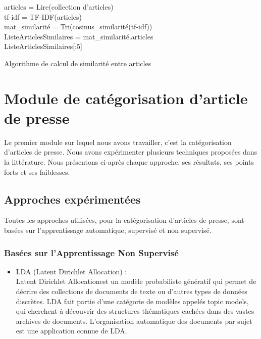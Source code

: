     \begin{algorithm2e}[H]
        \SetAlgoLined
        articles = Lire(collection d'articles)\\
        tf-idf = TF-IDF(articles)\\
        mat\_similarité = Tri(cosinus\_similarité(tf-idf))\\
        ListeArticlesSimilaires = mat\_similarité.articles\\
        \Return ListeArticlesSimilaires[:5]
        \caption{Algorithme de calcul de similarité entre articles}
    \end{algorithm2e}

\section{Module de catégorisation d'article de presse}
Le premier module sur lequel nous avons travailler, c'est la catégorisation d'articles de presse. Nous avons expérimenter plusieurs techniques proposées dans la littérature. Nous présentons ci-après chaque approche, ses résultats, ses points forts et ses faiblesses.

    \subsection{Approches expérimentées\label{approches}}
    Toutes les approches utilisées, pour la catégorisation d'articles de presse, sont basées sur l'apprentissage automatique, supervisé et non supervisé. 

    \subsubsection{Basées sur l'Apprentissage Non Supervisé}
        \begin{itemize}
            \item{LDA (Latent Dirichlet Allocation) : }\\
            \textquotedbl Latent Dirichlet Allocation\textquotedbl  est un modèle probabiliste génératif qui permet de décrire des collections de documents de texte ou d'autres types de données discrètes. LDA fait partie d'une catégorie de modèles appelés \textquotedbl topic models\textquotedbl , qui cherchent à découvrir des structures thématiques cachées dans des vastes archives de documents. L'organisation automatique des documents par sujet est une application connue de LDA.
        \end{itemize}
        
